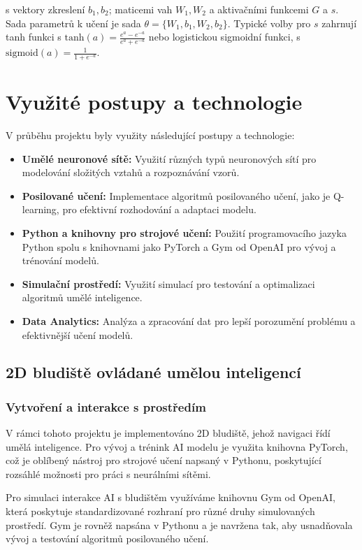 \documentclass[12pt, a4paper,
twoside,        %
openright
]{report}
\begin{document}
s vektory zkreslení \( b_1, b_2 \); maticemi vah \( W_1, W_2 \) a aktivačními funkcemi \( G \) a \( s \). Sada parametrů k učení je sada \( \theta = \{W_1, b_1, W_2, b_2\} \). Typické volby pro \( s \) zahrnují tanh funkci s \( \text{tanh}(a) = \frac{e^a - e^{-a}}{e^a + e^{-a}} \) nebo logistickou sigmoidní funkci, s \( \text{sigmoid}(a) = \frac{1}{1 + e^{-a}} \).

\chapter{Využité postupy a technologie}
V průběhu projektu byly využity následující postupy a technologie:

\begin{itemize}
	\item \textbf{Umělé neuronové sítě:} Využití různých typů neuronových sítí pro modelování složitých vztahů a rozpoznávání vzorů.
	\item \textbf{Posilované učení:} Implementace algoritmů posilovaného učení, jako je Q-learning, pro efektivní rozhodování a adaptaci modelu.
	\item \textbf{Python a knihovny pro strojové učení:} Použití programovacího jazyka Python spolu s knihovnami jako PyTorch a Gym od OpenAI pro vývoj a trénování modelů.
	\item \textbf{Simulační prostředí:} Využití simulací pro testování a optimalizaci algoritmů umělé inteligence.
	\item \textbf{Data Analytics:} Analýza a zpracování dat pro lepší porozumění problému a efektivnější učení modelů.
\end{itemize}

\section{2D bludiště ovládané umělou inteligencí}

\subsection{Vytvoření a interakce s prostředím}
V rámci tohoto projektu je implementováno 2D bludiště, jehož navigaci řídí umělá inteligence. Pro vývoj a trénink AI modelu je využita knihovna PyTorch, což je oblíbený nástroj pro strojové učení napsaný v Pythonu, poskytující rozsáhlé možnosti pro práci s neurálními sítěmi. 

Pro simulaci interakce AI s bludištěm využíváme knihovnu Gym od OpenAI, která poskytuje standardizované rozhraní pro různé druhy simulovaných prostředí. Gym je rovněž napsána v Pythonu a je navržena tak, aby usnadňovala vývoj a testování algoritmů posilovaného učení.
\end{document}
